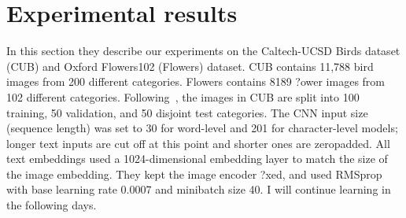 \documentclass[10pt,twocolumn,letterpaper]{article}
\begin{document}
\section{ Experimental results}\label{Section 1}
In this section they describe our experiments on the Caltech-UCSD Birds dataset (CUB) and Oxford Flowers102 (Flowers) dataset. CUB contains 11,788 bird images from 200 different categories. Flowers contains 8189 ?ower images from 102 different categories. Following~\cite{name1}, the images in CUB are split into 100 training, 50 validation, and 50 disjoint test categories. The CNN input size (sequence length) was set to 30 for word-level and 201 for character-level models; longer text inputs are cut off at this point and shorter ones are zeropadded. All text embeddings used a 1024-dimensional embedding layer to match the size of the image embedding. They kept the image encoder ?xed, and used RMSprop with base learning rate 0.0007 and minibatch size 40. I will continue learning in the following days.


\end{document}
